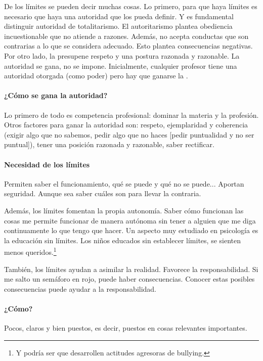 \documentclass[palatino]{apuntesURJC}
\begin{document}
De los límites se pueden decir muchas cosas. 
%
Lo primero, para que haya límites es necesario que haya una autoridad que los pueda definir.
%
Y es fundamental distinguir autoridad de totalitarismo.
%
El autoritarismo plantea obediencia incuestionable que no atiende a razones. 
%
Además, no acepta conductas que son contrarias a lo que se considera adecuado.
%
Esto plantea consecuencias negativas.
%
Por otro lado, la  presupene respeto y una postura razonada y razonable.
%
La autoridad se gana, no se impone. 
%
Inicialmente, cualquier profesor tiene una autoridad otorgada (como poder) pero hay que ganarse la .

\paragraph{¿Cómo se gana la autoridad?} Lo primero de todo es competencia profesional: dominar la materia y la profesión. 
%
Otros factores para ganar la autoridad son: respeto, ejemplaridad y coherencia (exigir algo que no sabemos, pedir algo que no haces [pedir puntualidad y no ser puntual]), tener una posición razonada y razonable, saber rectificar.

\paragraph{Necesidad de los límites} Permiten saber el funcionamiento, qué se puede y qué no se puede... Aportan seguridad. Aunque sea saber cuáles son para llevar la contraria.

Además, los límites fomentan la propia autonomía. 
%
Saber cómo funcionan las cosas me permite funcionar de manera autónoma sin tener a alguien que me diga continuamente lo que tengo que hacer.
%
Un aspecto muy estudiado en psicología es la educación sin límites. 
%
Los niños educados sin establecer límites, se sienten menos queridos.\footnote{Y podría ser que desarrollen actitudes agresoras de bullying.}

También, los límites ayudan a asimilar la realidad. 
%
Favorece la responsabilidad.
%
Si me salto un semáforo en rojo, puede haber consecuencias. 
%
Conocer estas posibles consecuencias puede ayudar a la responsabilidad.

\paragraph{¿Cómo?} Pocos, claros y bien puestos, es decir, puestos en cosas relevantes importantes.
\end{document}
